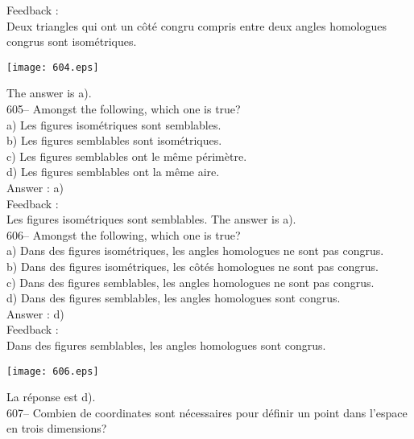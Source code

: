 ﻿\documentclass[letterpaper, 12pt]{article}
\begin{document}
Feedback : \\
Deux triangles qui ont un c\^ot\'e congru compris entre deux angles
homologues congrus sont isom\'etriques.   \begin{center}
    \texttt{[image: 604.eps]}
    \end{center}  The answer is a).\\

605-- Amongst the following, which one is true?\\
a) Les figures isom\'etriques sont semblables.\\
b) Les figures semblables sont isom\'etriques.\\
c) Les figures semblables ont le m\^eme p\'erim\`etre.\\
d) Les figures semblables ont la m\^eme aire.\\

Answer : a)\\

Feedback : \\
Les figures isom\'etriques sont semblables.  The answer is a).\\

606-- Amongst the following, which one is true?\\
a) Dans des figures isom\'etriques, les angles homologues ne sont pas
congrus.\\
b) Dans des figures isom\'etriques, les c\^ot\'es homologues ne sont pas
congrus.\\
c) Dans des figures semblables, les angles homologues ne sont pas congrus.\\
d) Dans des figures semblables, les angles homologues sont congrus.\\

Answer : d)\\

Feedback : \\
Dans des figures semblables, les angles homologues sont congrus.
\begin{center}
    \texttt{[image: 606.eps]}
    \end{center}  La
r\'eponse est d).\\

607-- Combien de coordinates sont n\'ecessaires pour d\'efinir un point
dans l'espace en trois dimensions?\\
\end{document}
